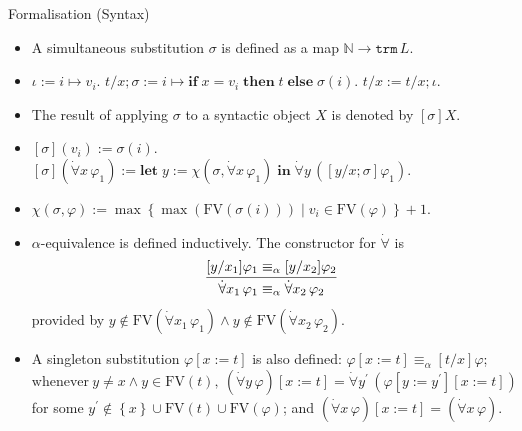 \documentclass[serif,table,10pt]{beamer}
\newcommand{\IN}{\mathbb{N}}
\newcommand{\0}{\texttt{0}}
\newcommand{\1}{\texttt{1}}
\newcommand{\FV}{\mathrm{FV}}
\newcommand{\Lall}[1]{\dot{\forall}#1\,}
\begin{document}
\begin{frame}{Formalisation (Syntax)}

    \begin{itemize}
        \item A simultaneous substitution $\sigma$ is defined as a map $\IN \to \mathtt{trm} \, L$.
        \item $ \iota := i \mapsto  v_i $. $ t / x ; \sigma := i \mapsto \mathbf{if} \; x = v_i \; \mathbf{then} \; t \; \mathbf{else} \; \sigma ( i ) $. $ t / x := t / x ; \iota $.
        \item<2-> The result of applying $\sigma$ to a syntactic object $X$ is denoted by $[ \sigma ] X$.
        \item<2-> $[ \sigma ] ( v_i ) := \sigma ( i ) $. $[ \sigma ] ( \Lall{ x } \varphi_1 ) := \mathbf{let} \; y := \chi ( \sigma , \Lall{ x } \varphi_1 ) \; \mathbf{in} \; \Lall{y} ([ y / x ; \sigma ] \varphi_1) $.
        \item<2-> $ \chi ( \sigma , \varphi ) := \max \left\{ \max ( \FV ( \sigma ( i ) ) ) \mid v_i \in \FV ( \varphi ) \right\} + 1$.
        \item<3-> $\alpha$-equivalence is defined inductively. The constructor for $\dot\forall$ is \[ \infer{\Lall{x_1} \varphi_1 \equiv_\alpha \Lall{x_2} \varphi_2}{[y / x_1] \varphi_1 \equiv_\alpha [y / x_2] \varphi_2} \] provided by $y \notin \FV ( \Lall{x_1} \varphi_1 ) \land y \notin \FV ( \Lall{x_2} \varphi_2 ) $.
        \item<4-> A singleton substitution $ \varphi [ x := t ] $ is also defined: $ \varphi[x := t] \equiv_\alpha [t / x] \varphi $;
        \[ \mathrm{whenever} \  y \ne x \land y \in \FV ( t ) , \  ( \Lall{y} \varphi ) [ x := t ] = \Lall{ y^\prime } ( \varphi [ y := y^\prime ][ x := t ] ) \] for some $y^\prime \notin \left\{ x \right\} \cup \FV ( t ) \cup \FV ( \varphi ) $; and $ ( \Lall{x} \varphi) [x := t] = (\Lall{x} \varphi) $.
    \end{itemize}

\end{frame}
\end{document}
